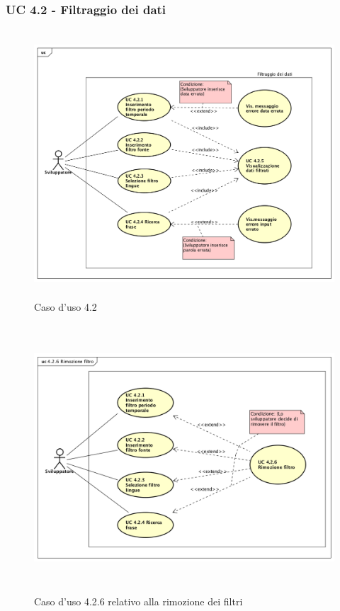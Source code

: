 \subsubsection{UC 4.2 - Filtraggio dei dati}
\begin{figure}[H]
\centering
\includegraphics[width=17cm, height=10cm]{img/UC420.png} 
\caption{Caso d'uso 4.2}\label{fig:420}
\end{figure}
\begin{figure}[H]
\centering
\includegraphics[width=17cm, height=10cm]{img/UC426.png} 
\caption{Caso d'uso 4.2.6 relativo alla rimozione dei filtri}\label{fig:426}
\end{figure}
